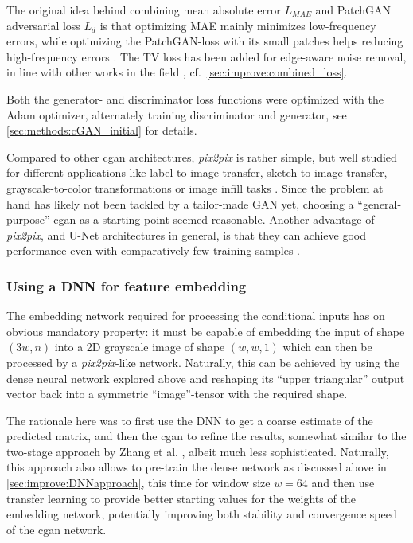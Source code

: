 The original idea behind combining mean absolute error $L_\mathit{MAE}$ and PatchGAN adversarial loss $L_d$ is that optimizing MAE 
mainly minimizes low-frequency errors, while optimizing the PatchGAN-loss with its small patches helps reducing high-frequency errors \cite{Isola2017}.
The TV loss has been added for edge-aware noise removal, in line with other works in the field \cite{Hong2020}, cf.~\cref{sec:improve:combined_loss}.

Both the generator- and discriminator loss functions were optimized with the Adam optimizer,
alternately training discriminator and generator, see \cref{sec:methods:cGAN_initial} for details.

Compared to other \acrshort{cgan} architectures, \emph{pix2pix} is rather simple, but well studied for different applications like label-to-image transfer,
sketch-to-image transfer, grayscale-to-color transformations or image infill tasks \cite{Isola2017}.
Since the problem at hand has likely not been tackled by a tailor-made GAN yet, 
choosing a ``general-purpose'' \acrshort{cgan} as a starting point seemed reasonable.
Another advantage of \emph{pix2pix}, and U-Net architectures in general, 
is that they can achieve good performance even with comparatively few training samples \cite{Isola2017, Ronneberger2015}.

\subsubsection{Using a DNN for feature embedding} \label{sec:improve:DNN_embedding}
The embedding network required for processing the conditional inputs
has on obvious mandatory property: it must be capable of embedding the input of shape $(3w,n)$ 
into a 2D grayscale image of shape $(w,w,1)$ which can then be processed by a \emph{pix2pix}-like network.
Naturally, this can be achieved by using the dense neural network explored above
and reshaping its ``upper triangular'' output vector back into a symmetric ``image''-tensor with the required shape.

The rationale here was to first use the DNN to get a coarse estimate of the predicted matrix,
and then the \acrshort{cgan} to refine the results, somewhat similar to the two-stage approach by Zhang et al. \cite{Zhang2019c},
albeit much less sophisticated. 
Naturally, this approach also allows to pre-train the dense network as discussed above in \cref{sec:improve:DNNapproach}, 
this time for window size $w=64$ and then use transfer learning to provide better starting values for the weights of the embedding network, 
potentially improving both stability and convergence speed of the \acrshort{cgan} network.

